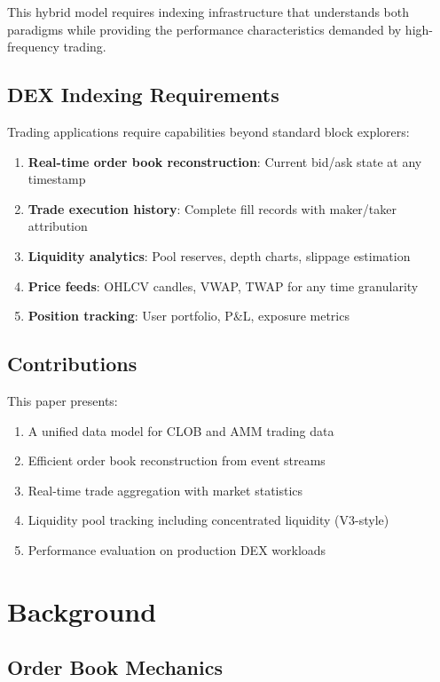 \documentclass[11pt,twocolumn]{article}
\begin{document}
This hybrid model requires indexing infrastructure that understands both paradigms while providing the performance characteristics demanded by high-frequency trading.

\subsection{DEX Indexing Requirements}

Trading applications require capabilities beyond standard block explorers:

\begin{enumerate}
\item \textbf{Real-time order book reconstruction}: Current bid/ask state at any timestamp
\item \textbf{Trade execution history}: Complete fill records with maker/taker attribution
\item \textbf{Liquidity analytics}: Pool reserves, depth charts, slippage estimation
\item \textbf{Price feeds}: OHLCV candles, VWAP, TWAP for any time granularity
\item \textbf{Position tracking}: User portfolio, P\&L, exposure metrics
\end{enumerate}

\subsection{Contributions}

This paper presents:

\begin{enumerate}
\item A unified data model for CLOB and AMM trading data
\item Efficient order book reconstruction from event streams
\item Real-time trade aggregation with market statistics
\item Liquidity pool tracking including concentrated liquidity (V3-style)
\item Performance evaluation on production DEX workloads
\end{enumerate}

\section{Background}

\subsection{Order Book Mechanics}
\end{document}
